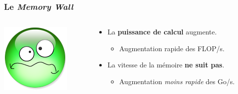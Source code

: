 \documentclass[xcolor={x11names,svgnames}, 14pt]{beamer}
\begin{document}
\begin{frame}
  \frametitle{Le \og \emph{Memory Wall}\fg{}}

    \begin{columns}[c]
    \begin{column}{.1\textwidth}
      \includegraphics[width=\textwidth]{triste.png}
    \end{column}
    \begin{column}{.9\textwidth}
      
  \begin{itemize}
  \item La \textbf{puissance de calcul} augmente.
    \begin{itemize}
    \item Augmentation rapide des FLOP/s.
    \end{itemize}

    \medskip
    
  \item La vitesse de la mémoire \textbf{ne suit pas}.
        \begin{itemize}
    \item Augmentation \emph{moins rapide} des Go/s.
    \end{itemize}
  \end{itemize}
\end{column}
\end{columns}


\end{frame}
\end{document}
